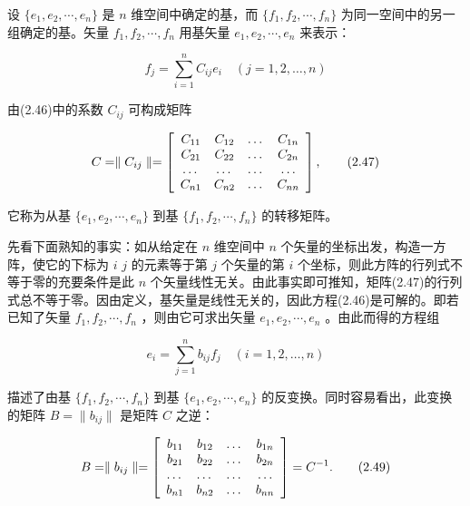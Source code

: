 设 $\{e_{1}, e_{2}, \cdots, e_{n}\}$ 是 $n$ 维空间中确定的基，而 $\{f_{1}, f_{2}, \cdots, f_{n}\}$ 为同一空间中的另一组确定的基。矢量 $f_{1}, f_{2}, \cdots, f_{n}$ 用基矢量 $e_{1}, e_{2}, \cdots, e_{n}$ 来表示：

\begin{equation*}
f _ {j} = \sum_ {i = 1} ^ {n} C _ {i j} e _ {i} \quad (j = 1, 2, \dots , n)\tag{2.46}
\end{equation*}

由(2.46)中的系数 $C_{ij}$ 可构成矩阵

\begin{equation*}
C = \parallel C _ {i j} \parallel = \left[ \begin{array}{c c c c} C _ {1 1} & C _ {1 2} & \dots & C _ {1 n} \\ C _ {2 1} & C _ {2 2} & \dots & C _ {2 n} \\ \dots & \dots & \dots & \dots \\ C _ {n 1} & C _ {n 2} & \dots & C _ {n n} \end{array} \right],\tag{2.47}
\end{equation*}

它称为从基 $\{e_{1}, e_{2}, \cdots, e_{n}\}$ 到基 $\{f_{1}, f_{2}, \cdots, f_{n}\}$ 的转移矩阵。

先看下面熟知的事实：如从给定在 $n$ 维空间中 $n$ 个矢量的坐标出发，构造一方阵，使它的下标为 $i$ $j$ 的元素等于第 $j$ 个矢量的第 $i$ 个坐标，则此方阵的行列式不等于零的充要条件是此 $n$ 个矢量线性无关。由此事实即可推知，矩阵(2.47)的行列式总不等于零。因由定义，基矢量是线性无关的，因此方程(2.46)是可解的。即若已知了矢量 $f_{1}, f_{2}, \cdots, f_{n}$ ，则由它可求出矢量 $e_{1}, e_{2}, \cdots, e_{n}$ 。由此而得的方程组

\begin{equation*}
e _ {i} = \sum_ {j = 1} ^ {n} b _ {i j} f _ {j} \quad (i = 1, 2, \dots , n)\tag{2.48}
\end{equation*}

描述了由基 $\{f_{1}, f_{2}, \cdots, f_{n}\}$ 到基 $\{e_{1}, e_{2}, \cdots, e_{n}\}$ 的反变换。同时容易看出，此变换的矩阵 $B = \|b_{ij}\|$ 是矩阵 $C$ 之逆：

\begin{equation*}
B = \parallel b _ {i j} \parallel = \left[ \begin{array}{c c c c} b _ {1 1} & b _ {1 2} & \dots & b _ {1 n} \\ b _ {2 1} & b _ {2 2} & \dots & b _ {2 n} \\ \dots & \dots & \dots & \dots \\ b _ {n 1} & b _ {n 2} & \dots & b _ {n n} \end{array} \right] = C ^ {- 1}.\tag{2.49}
\end{equation*}

